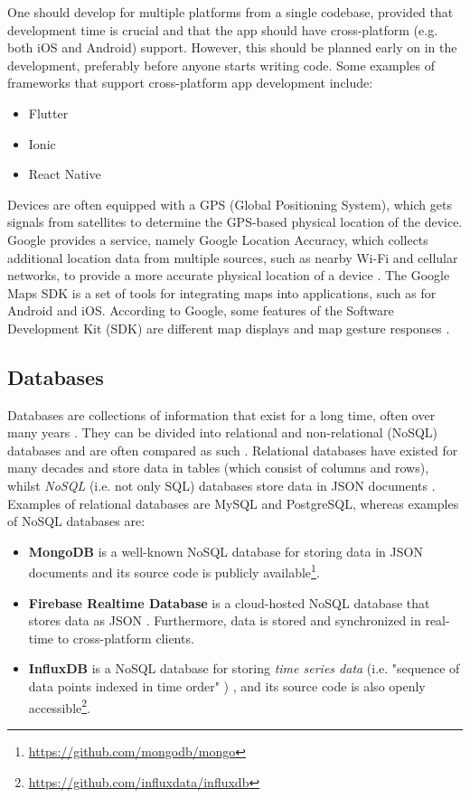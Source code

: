 \documentclass{article}
\begin{document}
One should develop for multiple platforms from a single codebase, provided that development time is crucial and that the app should have cross-platform (e.g. both iOS and Android) support. However, this should be planned early on in the development, preferably before anyone starts writing code. Some examples of frameworks that support cross-platform app development include:

\begin{itemize}
    \item Flutter
    \item Ionic
    \item React Native
\end{itemize}

Devices are often equipped with a GPS (Global Positioning System), which gets signals from satellites to determine the GPS-based physical location of the device. Google provides a service, namely Google Location Accuracy, which collects additional location data from multiple sources, such as nearby Wi-Fi and cellular networks, to provide a more accurate physical location of a device \cite{noauthor_how_nodate}. The Google Maps SDK is a set of tools for integrating maps into applications, such as for Android and iOS. According to Google, some features of the Software Development Kit (SDK) are different map displays and map gesture responses \cite{noauthor_maps_nodate}.

\subsection{Databases}\label{subsec:Databases}
Databases are collections of information that exist for a long time, often over many years \cite{garcia-molina_database_2002}. They can be divided into relational and non-relational (NoSQL) databases and are often compared as such \cite{mohamed_relational_2014}. Relational databases have existed for many decades and store data in tables (which consist of columns and rows), whilst \emph{NoSQL} (i.e. not only SQL) databases store data in JSON documents \cite{garcia-molina_database_2002, sudiartha_data_2020}. Examples of relational databases are MySQL and PostgreSQL, whereas examples of NoSQL databases are: 
\begin{itemize}
    \item \textbf{MongoDB} is a well-known NoSQL database for storing data in JSON documents and its source code is publicly available\footnote{\url{https://github.com/mongodb/mongo}}.
    \item \textbf{Firebase Realtime Database} is a cloud-hosted NoSQL database that stores data as JSON  \cite{noauthor_firebase_nodate}. Furthermore, data is stored and synchronized in real-time to cross-platform clients.
    \item \textbf{InfluxDB} is a NoSQL database for storing \emph{time series data} (i.e. "sequence of data points indexed in time order" \cite{noauthor_what_nodate})  \cite{noauthor_influxdb_nodate}, and its source code is also openly accessible\footnote{\url{https://github.com/influxdata/influxdb}}.
\end{itemize}
\end{document}

